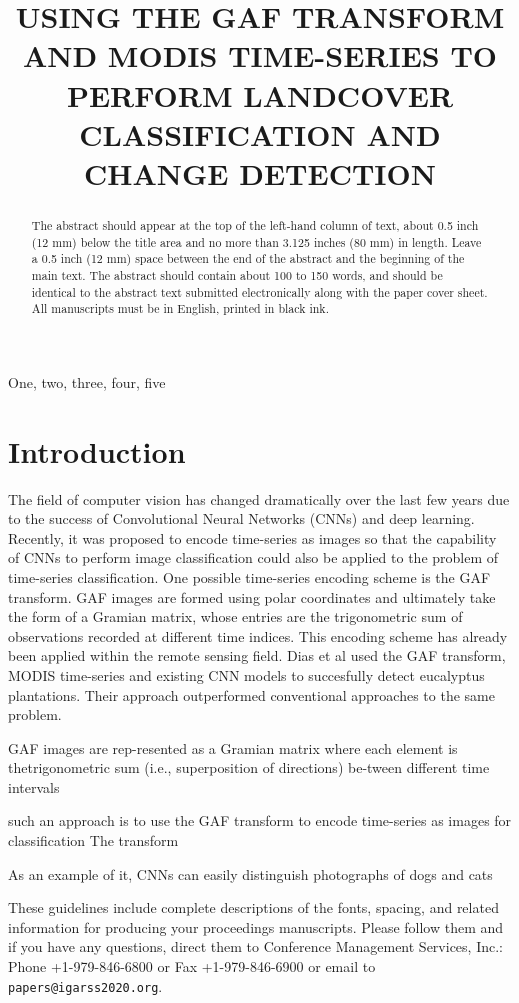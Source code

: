 \documentclass{article}
\title{USING THE GAF TRANSFORM AND MODIS TIME-SERIES TO PERFORM LANDCOVER CLASSIFICATION AND CHANGE DETECTION}
\begin{document}
%
\maketitle
%
\begin{abstract}
The abstract should appear at the top of the left-hand column of text, about
0.5 inch (12 mm) below the title area and no more than 3.125 inches (80 mm) in
length.  Leave a 0.5 inch (12 mm) space between the end of the abstract and the
beginning of the main text.  The abstract should contain about 100 to 150
words, and should be identical to the abstract text submitted electronically
along with the paper cover sheet.  All manuscripts must be in English, printed
in black ink.
\end{abstract}
%
\begin{keywords}
One, two, three, four, five
\end{keywords}
%
\section{Introduction}
\label{sec:intro}
The field of computer vision has changed dramatically over the last few years due to the success of Convolutional Neural Networks (CNNs) and deep learning. Recently, it was proposed to encode time-series as images so that the capability of CNNs to perform image classification could also be applied to the problem of time-series classification. One possible time-series encoding scheme is the GAF transform. GAF images are formed using polar coordinates and ultimately take the form of a Gramian matrix, whose entries are the trigonometric sum of observations recorded at different time indices. This encoding scheme has already been applied within the remote sensing field. Dias et al used the GAF transform, MODIS time-series and existing CNN models to succesfully detect eucalyptus plantations. Their approach outperformed conventional approaches to the same problem.       


GAF images are rep-resented as a Gramian matrix where each element is thetrigonometric sum (i.e., superposition of directions) be-tween different time intervals


such an approach is to use the GAF transform to encode time-series as images for classification The  transform  



As an example of it, CNNs can easily distinguish photographs of dogs and cats  


These guidelines include complete descriptions of the fonts, spacing, and
related information for producing your proceedings manuscripts. Please follow
them and if you have any questions, direct them to Conference Management
Services, Inc.: Phone +1-979-846-6800 or Fax +1-979-846-6900 or email
to \verb+papers@igarss2020.org+.
\end{document}
